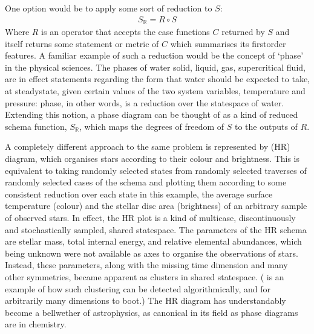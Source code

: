 \documentclass[letterpaper,10pt,english]{jupyterBook}
\begin{document}
\sphinxAtStartPar
One option would be to apply some sort of reduction to \(S\):
\begin{equation*}
\begin{split} S_{\mathbb{R}} = R \circ S \end{split}
\end{equation*}
\sphinxAtStartPar
Where \(R\) is an operator that accepts the case functions \(C\) returned by \(S\) and itself returns some statement or metric of \(C\) which summarises its first\sphinxhyphen{}order features. A familiar example of such a reduction would be the concept of ‘phase’ in the physical sciences. The phases of water \sphinxhyphen{} solid, liquid, gas, supercritical fluid,  \sphinxhyphen{} are in effect statements regarding the form that water should be expected to take, at steady\sphinxhyphen{}state, given certain values of the two system variables, temperature and pressure: phase, in other words, is a reduction over the state\sphinxhyphen{}space of water. Extending this notion, a phase diagram can be thought of as a kind of reduced schema function, \(S_{\mathbb{R}}\), which maps the degrees of freedom of \(S\) to the outputs of \(R\).

\sphinxAtStartPar
A completely different approach to the same problem is represented by  (HR) diagram, which organises stars according to their colour and brightness. This is equivalent to taking randomly selected states from randomly selected traverses of randomly selected cases of the schema and plotting them according to some consistent reduction over each state \sphinxhyphen{} in this example, the average surface temperature (colour) and the stellar disc area (brightness) of an arbitrary sample of observed stars. In effect, the HR plot is a kind of multi\sphinxhyphen{}case, discontinuously and stochastically sampled, shared state\sphinxhyphen{}space. The parameters of the HR schema are stellar mass, total internal energy, and relative elemental abundances, which \sphinxhyphen{} being  unknown \sphinxhyphen{} were not available as axes to organise the observations of stars. Instead, these parameters, along with the missing time dimension and many other symmetries, became apparent  as clusters in shared state\sphinxhyphen{}space. ( is an example of how such clustering can be detected algorithmically, and for arbitrarily many dimensions to boot.) The HR diagram has understandably become a bellwether of astrophysics, as canonical in its field as phase diagrams are in chemistry.
\end{document}
